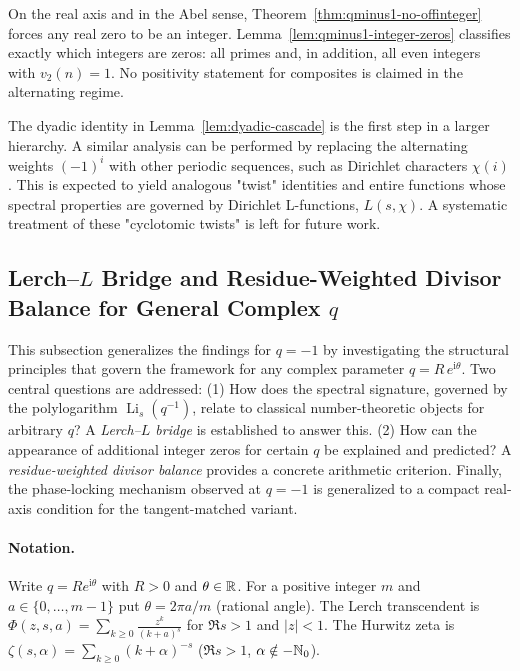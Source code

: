 \begin{remark}[Scope]
On the real axis and in the Abel sense, Theorem~\ref{thm:qminus1-no-offinteger} forces any real zero to be an integer.
Lemma~\ref{lem:qminus1-integer-zeros} classifies exactly which integers are zeros: all primes and, in addition, all even integers with $v_2(n)=1$.
No positivity statement for composites is claimed in the alternating regime.
\end{remark}

\begin{remark}
The dyadic identity in Lemma~\ref{lem:dyadic-cascade} is the first step in a larger hierarchy. A similar analysis can be performed by replacing the alternating weights $(-1)^i$ with other periodic sequences, such as Dirichlet characters $\chi(i)$. This is expected to yield analogous "twist" identities and entire functions whose spectral properties are governed by Dirichlet L-functions, $L(s,\chi)$. A systematic treatment of these "cyclotomic twists" is left for future work.
\end{remark}


\subsection{Lerch--\texorpdfstring{$L$}{L} Bridge and Residue-Weighted Divisor Balance for General Complex \texorpdfstring{$q$}{q}}
\label{subsec:lerch-L-bridge}

This subsection generalizes the findings for $q=-1$ by investigating the structural principles that govern the framework for any complex parameter $q=R\,e^{\mathrm{i}\theta}$. Two central questions are addressed: (1) How does the spectral signature, governed by the polylogarithm $\operatorname{Li}_s(q^{-1})$, relate to classical number-theoretic objects for arbitrary $q$? A \emph{Lerch--$L$ bridge} is established to answer this. (2) How can the appearance of additional integer zeros for certain $q$ be explained and predicted? A \emph{residue-weighted divisor balance} provides a concrete arithmetic criterion. Finally, the phase-locking mechanism observed at $q=-1$ is generalized to a compact real-axis condition for the tangent-matched variant.

\paragraph{Notation.}
Write $q=R e^{\mathrm{i}\theta}$ with $R>0$ and $\theta\in\mathbb{R}$.
For a positive integer $m$ and $a\in\{0,\dots,m-1\}$ put $\theta=2\pi a/m$ (rational angle).
The Lerch transcendent is $\Phi(z,s,a)=\sum_{k\ge0} \frac{z^{k}}{(k+a)^{s}}$ for $\Re s>1$ and
$|z|<1$. The Hurwitz zeta is $\zeta(s,\alpha)=\sum_{k\ge0} (k+\alpha)^{-s}$ ($\Re s>1$, $\alpha\notin -\mathbb{N}_0$).

